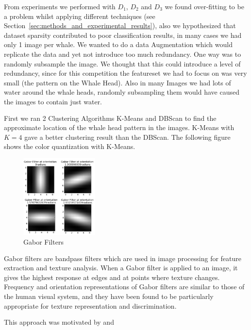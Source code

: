 From experiments we performed with $D_{1}$, $D_{2}$ and $D_{3}$ we found over-fitting to be a problem whilst applying different techniques (see Section~\ref{sec:methods_and_experimental_results}), also we hypothesized that dataset sparsity contributed to poor classification results, in many cases we had only 1 image per whale. We wanted to do a data Augmentation which would replicate the data and yet not introduce too much redundancy. One way was to randomly subsample the image. We thought that this could introduce a level of redundancy, since for this competition the featureset we had to focus on was very small (the pattern on the Whale Head). Also in many Images we had lots of water around the whale heads, randomly subsampling them would have caused the images to contain just water.

First we ran 2 Clustering Algorithms K-Means and DBScan to find the approximate location of the whale head pattern in the images. K-Means with $K = 4$ gave a better clustering result than the DBScan. The following figure shows the color quantization with K-Means.

\begin{figure}
	\vspace{-0.6cm}
	\centering	
	\includegraphics[width=0.35\textwidth]{sections/imgs/preprocessing/gabor_filter.jpg}
	\caption{Gabor Filters}
	\label{fig:gaborFilters}
	\vspace{-2.0cm}
\end{figure}

Gabor filters are bandpass filters which are used in image processing for feature extraction and  texture analysis. When a Gabor filter is applied to an image, it gives the highest response at edges and at points where texture changes. Frequency and orientation representations of Gabor filters are similar to those of the human visual system, and they have been found to be particularly appropriate for texture representation and discrimination. 

This approach was motivated by \cite{Gabor1} and \cite{Gabor2}

